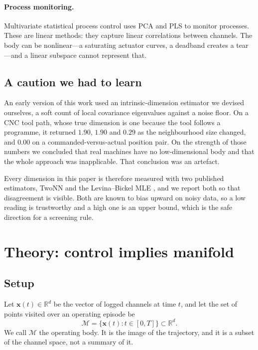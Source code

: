 \documentclass[11pt]{article}
\newcommand{\R}{\mathbb{R}}
\newcommand{\x}{\bm{x}}
\newcommand{\bdy}{\mathcal{M}}
\begin{document}
\paragraph{Process monitoring.} Multivariate statistical process control
\cite{kourti1995,nomikos1995,macgregor1995} uses PCA and PLS to monitor
processes. These are linear methods: they capture linear correlations between
channels. The body can be nonlinear---a saturating actuator curves, a
deadband creates a tear---and a linear subspace cannot represent that.

\subsection{A caution we had to learn}

An early version of this work used an intrinsic-dimension estimator we devised
ourselves, a soft count of local covariance eigenvalues against a noise floor.
On a CNC tool path, whose true dimension is one because the tool follows a
programme, it returned $1.90$, $1.90$ and $0.29$ as the neighbourhood size
changed, and $0.00$ on a commanded-versus-actual position pair. On the
strength of those numbers we concluded that real machines have no
low-dimensional body and that the whole approach was inapplicable. That
conclusion was an artefact.

Every dimension in this paper is therefore measured with two published
estimators, TwoNN \cite{facco2017} and the Levina--Bickel MLE
\cite{levina2004}, and we report both so that disagreement is visible.
Both are known to bias upward on noisy data, so a low reading is trustworthy
and a high one is an upper bound, which is the safe direction for a screening
rule.

\section{Theory: control implies manifold}
\label{sec:theory}

\subsection{Setup}

Let $\x(t) \in \R^d$ be the vector of logged channels at time $t$, and let the
set of points visited over an operating episode be
\[
  \bdy = \{\x(t) : t \in [0, T]\} \subset \R^d.
\]
We call $\bdy$ the operating body. It is the image of the trajectory, and it
is a subset of the channel space, not a summary of it.
\end{document}
